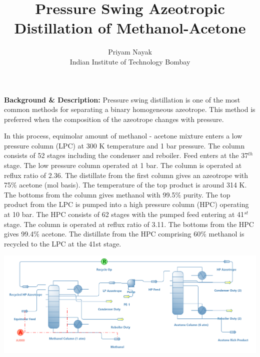 \documentclass[a4paper,12pt]{article}
\title{Pressure Swing Azeotropic Distillation of Methanol-Acetone}
\author{Priyam Nayak \\ Indian Institute of Technology Bombay}
\date{}
\begin{document}
\maketitle

\noindent \textbf{Background \& Description:}
\newline Pressure swing distillation is one of the most common methods for separating a binary homogeneous azeotrope. This method is preferred when the composition of the azeotrope changes with pressure. 


In this process, equimolar amount of methanol - acetone mixture enters a low pressure column (LPC) at 300 K temperature and 1 bar pressure. The column consists of 52 stages including the condenser and reboiler. Feed enters at the 37$^{th}$ stage. The low pressure column operated at 1 bar. The column is operated at reflux ratio of 2.36. The distillate from the first column gives an azeotrope with 75\% acetone (mol basis). The temperature of the top product is around 314 K. The bottoms from the column gives methanol with 99.5\% purity. The top product from the LPC is pumped into a high pressure column (HPC) operating at 10 bar. The HPC consists of 62 stages with the pumped feed entering at 41$^{st}$ stage. The column is operated at reflux ratio of 3.11. The bottoms from the HPC gives 99.4\% acetone. The distillate from the HPC comprising 60\% methanol is recycled to the LPC at the 41st stage.


\vspace{25mm}
\centerline{\includegraphics[width=0.85\linewidth]{PSD-Methanol-Acetone.png}}
\end{document}
